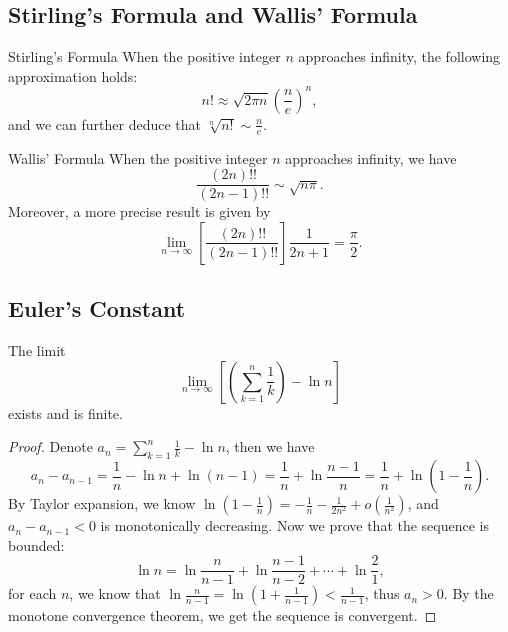 \subsection{Stirling's Formula and Wallis' Formula}

\begin{theorem}{Stirling's Formula}{}
  When the positive integer $n$ approaches infinity,
  the following approximation holds:
  \begin{equation}
    n! \approx \sqrt{2\pi n} \left( \frac{n}{e} \right)^n,
  \end{equation}
  and we can further deduce that $\sqrt[n]{n!} \sim \frac{n}{e}$.
\end{theorem}

\begin{theorem}{Wallis' Formula}{}
  When the positive integer $n$ approaches infinity,
  we have
  \begin{equation}
    \frac{(2n)!!}{(2n - 1)!!} \sim \sqrt{n \pi}.
  \end{equation}
  Moreover, a more precise result is given by
  \begin{equation}
    \lim \limits _{n \rightarrow \infty} \left[
      \frac{(2n)!!}{(2n - 1)!!}
    \right]\frac{1}{2n+1} = \frac{\pi}{2}.
  \end{equation}
\end{theorem}

\subsection{Euler's Constant}

\begin{lemma}{}{}
  The limit
  \begin{equation}
    \lim \limits _{n \rightarrow \infty}
  \left[ (\sum\limits_{k = 1}^n \frac{1}{k}) - \ln n \right]
  \end{equation}
  exists and is finite.
\end{lemma}

\begin{proof}
  Denote $a_n = \sum\limits_{k = 1}^n \frac{1}{k} - \ln n$,
  then we have
  \begin{equation}
    a_n - a_{n-1} = \frac{1}{n} - \ln n + \ln (n-1) = \frac{1}{n} + \ln \frac{n-1}{n} = \frac{1}{n} + \ln (1 - \frac{1}{n}).
  \end{equation}
  By Taylor expansion, we know $\ln (1 - \frac{1}{n}) = - \frac{1}{n} -
  \frac{1}{2n^2} + o(\frac{1}{n^2})$,
  and $a_n - a_{n-1} < 0$ is monotonically decreasing.
  Now we prove that the sequence is bounded:
  \begin{equation}
    \ln n = \ln \frac{n}{n-1} + \ln \frac{n-1}{n-2} + \cdots + \ln \frac{2}{1},
  \end{equation}
  for each $n$, we know that $\ln \frac{n}{n-1} = \ln (1 + \frac{1}{n-1}) <
  \frac{1}{n-1}$,
  thus $a_n > 0$.
  By the monotone convergence theorem, we get the sequence is convergent.
\end{proof}

